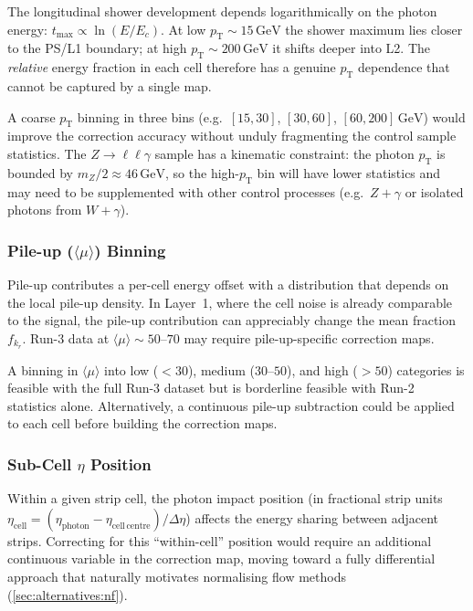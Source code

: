 \documentclass[11pt,a4paper]{article}
\newcommand{\avgmu}{\langle\mu\rangle}
\begin{document}
The longitudinal shower development depends logarithmically on the
photon energy: $t_\mathrm{max} \propto \ln(E/E_c)$.  At low
$p_\mathrm{T} \sim 15\,\mathrm{GeV}$ the shower maximum lies closer
to the PS/L1 boundary; at high $p_\mathrm{T} \sim 200\,\mathrm{GeV}$
it shifts deeper into L2.  The \emph{relative} energy fraction in
each cell therefore has a genuine $p_\mathrm{T}$ dependence that
cannot be captured by a single map.

A coarse $p_\mathrm{T}$ binning in three bins
(e.g.\ $[15, 30]$, $[30, 60]$, $[60, 200]\,\mathrm{GeV}$) would
improve the correction accuracy without unduly fragmenting the
control sample statistics.  The $Z \to \ell\ell\gamma$ sample has
a kinematic constraint: the photon $p_\mathrm{T}$ is bounded by
$m_{Z}/2 \approx 46\,\mathrm{GeV}$, so the high-$p_\mathrm{T}$
bin will have lower statistics and may need to be supplemented
with other control processes (e.g.\ $Z + \gamma$ or isolated photons
from $W + \gamma$).

\subsubsection{Pile-up ($\avgmu$) Binning}

Pile-up contributes a per-cell energy offset with a distribution
that depends on the local pile-up density.  In Layer~1, where the
cell noise is already comparable to the signal, the pile-up
contribution can appreciably change the mean fraction $f_{k_r}$.
Run-3 data at $\avgmu \sim 50$--$70$ may require pile-up-specific
correction maps.

A binning in $\avgmu$ into low ($< 30$), medium ($30$--$50$), and
high ($> 50$) categories is feasible with the full Run-3 dataset
but is borderline feasible with Run-2 statistics alone.  Alternatively,
a continuous pile-up subtraction could be applied to each cell before
building the correction maps.

\subsubsection{Sub-Cell $\eta$ Position}

Within a given strip cell, the photon impact position (in fractional
strip units $\eta_\mathrm{cell} = (\eta_\mathrm{photon} - \eta_\mathrm{cell\,centre})/\Delta\eta$)
affects the energy sharing between adjacent strips.  Correcting for this
``within-cell'' position would require an additional continuous variable
in the correction map, moving toward a fully differential approach
that naturally motivates normalising flow methods (\cref{sec:alternatives:nf}).
\end{document}

